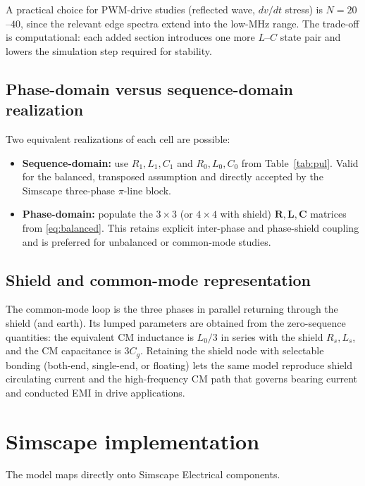 \documentclass[11pt,a4paper,oneside]{book}
\newcommand{\Rmat}{\bm{R}}
\newcommand{\Lmat}{\bm{L}}
\newcommand{\Cmat}{\bm{C}}
\begin{document}
\begin{onehalfspace}
\begin{appendices}
\noindent
A practical choice for PWM-drive studies (reflected wave, $dv/dt$ stress) is
$N=20$--$40$, since the relevant edge spectra extend into the low-MHz range. The
trade-off is computational: each added section introduces one more $L$--$C$ state
pair and lowers the simulation step required for stability.

\subsection{Phase-domain versus sequence-domain realization}
Two equivalent realizations of each cell are possible:
\begin{itemize}[leftmargin=*]
	\item \textbf{Sequence-domain:} use $R_1,L_1,C_1$ and $R_0,L_0,C_0$ from
	Table~\ref{tab:pul}. Valid for the balanced, transposed assumption and directly
	accepted by the Simscape three-phase $\pi$-line block.
	\item \textbf{Phase-domain:} populate the $3\times3$ (or $4\times4$ with shield)
	$\Rmat,\Lmat,\Cmat$ matrices from \eqref{eq:balanced}. This retains explicit
	inter-phase and phase-shield coupling and is preferred for unbalanced or
	common-mode studies.
\end{itemize}

\subsection{Shield and common-mode representation}
The common-mode loop is the three phases in parallel returning through the shield
(and earth). Its lumped parameters are obtained from the zero-sequence quantities:
the equivalent CM inductance is $L_0/3$ in series with the shield $R_s,L_s$, and
the CM capacitance is $3C_g$. Retaining the shield node with selectable bonding
(both-end, single-end, or floating) lets the same model reproduce shield
circulating current and the high-frequency CM path that governs bearing current
and conducted EMI in drive applications.

\section{Simscape implementation}\label{sec:simscape}
The model maps directly onto Simscape Electrical components.


\end{appendices}
\end{onehalfspace}
\end{document}
